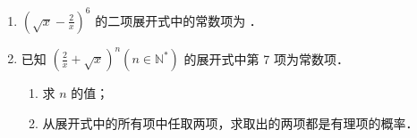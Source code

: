 \begin{enumerate}
    \item $\left(\sqrt{x}-\frac{2}{x}\right)^{6}$ 的二项展开式中的常数项为 \underline{\hspace{2cm}} ．

    \item 已知 $\left(\frac{2}{x}+\sqrt{x}\right)^{n}\left(n \in \mathbb{N}^{*}\right)$ 的展开式中第 7 项为常数项．
          \begin{enumerate}[(1)]
              \item 求 $n$ 的值；
              \item 从展开式中的所有项中任取两项，求取出的两项都是有理项的概率．
          \end{enumerate}
\end{enumerate}